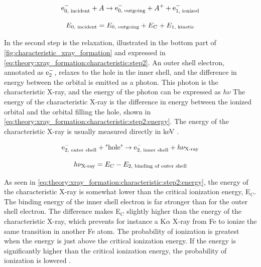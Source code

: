 \begin{equation}
    \label{eq:theory:xray_formation:characteristic:step1}
    \textnormal{e}^-_{0 \textnormal{, incident}} + A \rightarrow \textnormal{e}^-_{0 \textnormal{, outgoing}} + A^+ + \textnormal{e}^-_{1 \textnormal{, ionized}}
\end{equation}

\begin{equation}
    \label{eq:theory:xray_formation:characteristic:step1:energy_balance}
    E_{0 {\textnormal{, incident}}} = E_{0 {\textnormal{, outgoing}}} + E_{C} + E_{1 {\textnormal{, kinetic}}}
\end{equation}




In the second step is the relaxation, illustrated in the bottom part of \cref{fig:characteristic_xray_formation} and expressed in \cref{eq:theory:xray_formation:characteristic:step2}.
An outer shell electron, annotated as $\textnormal{e}^-_{2}$, relaxes to the hole in the inner shell, and the difference in energy between the orbital is emitted as a photon.
This photon is the characteristic X-ray, and the energy of the photon can be expressed as $h\nu$ \cite[Eq. (8.12)]{hollas_modern_2004}
The energy of the characteristic X-ray is the difference in energy between the ionized orbital and the orbital filling the hole, shown in \cref{eq:theory:xray_formation:characteristic:step2:energy}.
The energy of the characteristic X-ray is usually measured directly in keV \cite[Eq. (4.2b)]{goldstein_scanning_2018}.


\begin{equation}
    \label{eq:theory:xray_formation:characteristic:step2}
    \textnormal{e}^-_{2 {\textnormal{, outer shell}}} + \textnormal{"hole"} \rightarrow \textnormal{e}^-_{2 {\textnormal{, inner shell}}} + h\nu_{\textnormal{X-ray}}
\end{equation}


\begin{equation}
    \label{eq:theory:xray_formation:characteristic:step2:energy}
    h\nu_{\textnormal{X-ray}} = E_C - E_{2 {\textnormal{, binding of outer shell}}}
\end{equation}


As seen in \cref{eq:theory:xray_formation:characteristic:step2:energy}, the energy of the characteristic X-ray is somewhat lower than the critical ionization energy, E$_C$.
The binding energy of the inner shell electron is far stronger than for the outer shell electron.
The difference makes E$_C$ slightly higher than the energy of the characteristic X-ray, which prevents for instance a K$\alpha$ X-ray from Fe to ionize the same transition in another Fe atom.
The probability of ionization is greatest when the energy is just above the critical ionization energy.
If the energy is significantly higher than the critical ionization energy, the probability of ionization is lowered \cite[p. 78]{curry_radiology_k_absorption}.


